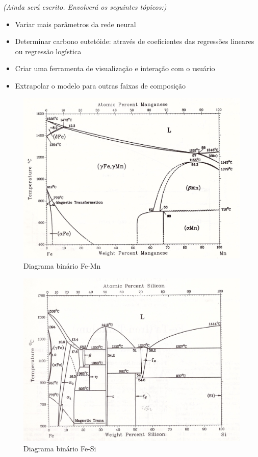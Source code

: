 \documentclass[brazil,tf,epusp]{usp}  %
\begin{document}
\textit{(Ainda será escrito. Envolverá os seguintes tópicos:)}

 \begin{itemize} 
\item Variar mais parâmetros da rede neural
\item Determinar carbono eutetóide: através de coeficientes das regressões lineares ou regressão logística
\item Criar uma ferramenta de visualização e interação com o usuário
\item Extrapolar o modelo para outras faixas de composição
 \end{itemize} 





\label{an:diag_bin}

\begin{figure}
  \includegraphics[width=1.1\textwidth]{img/Fe-Mn.jpg}
  \caption{Diagrama binário Fe-Mn}
  \label{fig:bin_fe-mn}
\end{figure}

\begin{figure}
  \includegraphics[width=1.1\textwidth]{img/Fe-Si.jpg}
  \caption{Diagrama binário Fe-Si}
  \label{fig:bin_fe-si}
\end{figure}
\end{document}
